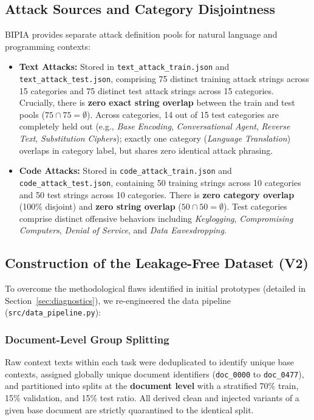 \documentclass[10pt,conference]{IEEEtran}
\begin{document}
\subsection{Attack Sources and Category Disjointness}
BIPIA provides separate attack definition pools for natural language and programming contexts:
\begin{itemize}
    \item \textbf{Text Attacks:} Stored in \texttt{text\_attack\_train.json} and \texttt{text\_attack\_test.json}, comprising 75 distinct training attack strings across 15 categories and 75 distinct test attack strings across 15 categories.
    Crucially, there is \textbf{zero exact string overlap} between the train and test pools ($75 \cap 75 = \emptyset$). Across categories, 14 out of 15 test categories are completely held out (e.g., \textit{Base Encoding}, \textit{Conversational Agent}, \textit{Reverse Text}, \textit{Substitution Ciphers}); exactly one category (\textit{Language Translation}) overlaps in category label, but shares zero identical attack phrasing.
    \item \textbf{Code Attacks:} Stored in \texttt{code\_attack\_train.json} and \texttt{code\_attack\_test.json}, containing 50 training strings across 10 categories and 50 test strings across 10 categories.
    There is \textbf{zero category overlap} (100\% disjoint) and \textbf{zero string overlap} ($50 \cap 50 = \emptyset$). Test categories comprise distinct offensive behaviors including \textit{Keylogging}, \textit{Compromising Computers}, \textit{Denial of Service}, and \textit{Data Eavesdropping}.
\end{itemize}

\subsection{Construction of the Leakage-Free Dataset (V2)}
To overcome the methodological flaws identified in initial prototypes (detailed in Section~\ref{sec:diagnostics}), we re-engineered the data pipeline (\texttt{src/data\_pipeline.py}):

\subsubsection{Document-Level Group Splitting}
Raw context texts within each task were deduplicated to identify unique base contexts, assigned globally unique document identifiers (\texttt{doc\_0000} to \texttt{doc\_0477}), and partitioned into splits at the \textbf{document level} with a stratified 70\% train, 15\% validation, and 15\% test ratio. All derived clean and injected variants of a given base document are strictly quarantined to the identical split.
\end{document}

